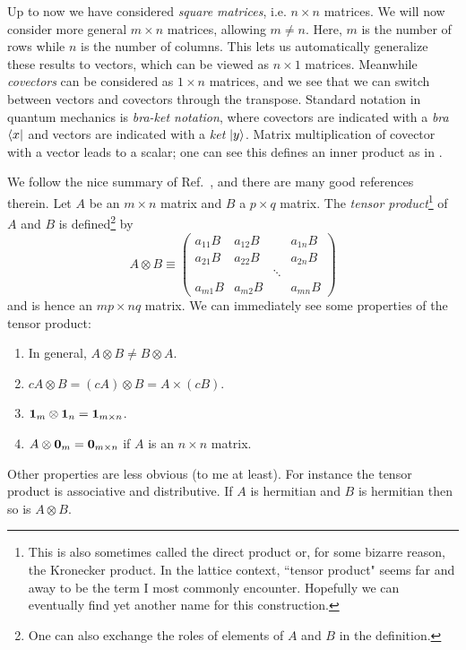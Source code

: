 
Up to now we have considered {\it square matrices},
i.e. $n\times n$ matrices. We will now consider more general
$m\times n$ matrices, allowing $m\neq n$. Here, $m$ is the number
of rows while $n$ is the number of columns. This lets us automatically
generalize these results to vectors, which can be viewed as
$n\times 1$ matrices. Meanwhile {\it covectors}
can be considered as $1\times n$ matrices, and we see that we can switch
between vectors and covectors through the transpose. Standard notation
in quantum mechanics is {\it bra-ket notation},
where covectors are indicated with a {\it bra} $\bra{x}$ and
vectors are indicated with a {\it ket} $\ket{y}$.
Matrix multiplication of covector with a vector leads to a scalar;
one can see this defines an inner product as in .

We follow the nice summary of Ref.~\cite{matrixCalc}, and there
are many good references therein.
Let $A$ be an $m\times n$ matrix and $B$ a $p\times q$ matrix. 
The {\it tensor product}\footnote{This is also sometimes called
the direct product 
or, for some bizarre reason,
the Kronecker product. 
In the lattice context, ``tensor product" seems far and away to be
the term I most commonly encounter.
Hopefully we can eventually
find yet another name for this construction.} 
of $A$ and $B$ is defined\footnote{One can also exchange the roles
of elements of $A$ and $B$ in the definition.} by
\begin{equation}
A \otimes B\equiv\left(\begin{array}{cccc}
a_{11} B & a_{12} B &  & a_{1 n} B \\
a_{21} B & a_{22} B &  & a_{2 n} B \\
 &  & \ddots &  \\
a_{m 1} B & a_{m 2} B &  & a_{m n} B
\end{array}\right)
\end{equation}
and is hence an $mp\times nq$ matrix.
We can immediately see some properties of the tensor product:
\begin{enumerate}
\item In general, $A\otimes B\neq B\otimes A$. 
\item $cA\otimes B=(cA)\otimes B=A\times(cB)$.
\item ${\mathbf 1}_m\otimes{\mathbf 1}_n={\mathbf 1}_{m\times n}$.
\item $A\otimes {\mathbf 0}_m={\mathbf 0}_{m\times n}$ if $A$ is an $n\times n$ matrix.
\end{enumerate}
Other properties are less obvious (to me at least). For instance
the tensor product is associative and distributive.
If $A$ is hermitian and $B$ is hermitian then so is $A\otimes B$.

